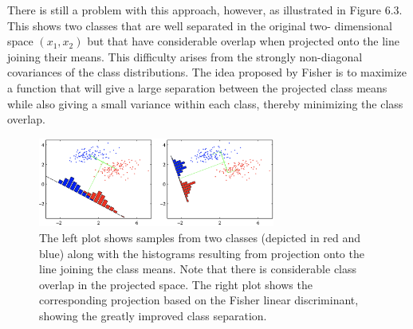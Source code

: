 \documentclass[twoside]{article}
\begin{document}
There is still a problem with this approach, however, as illustrated in Figure 6.3. This shows two classes that are well separated in the original two- dimensional space $(x_1, x_2)$ but that have considerable overlap when projected onto the line joining their means. This difficulty arises from the strongly non-diagonal covariances of the class distributions. The idea proposed by Fisher is to maximize a function that will give a large separation between the projected class means while also giving a small variance within each class, thereby minimizing the class overlap.
\newpage
\begin{figure}[h]
    \centering
    \includegraphics[width=0.70\textwidth]{img/fisher.png}
    \caption{The left plot shows samples from two classes (depicted in red and blue) along with the histograms resulting from projection onto the line joining the class means. Note that there is considerable class overlap in the projected space. The right plot shows the corresponding projection based on the Fisher linear discriminant, showing the greatly improved class separation.}
\end{figure}
\end{document}
